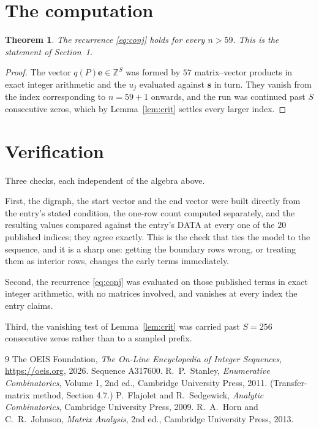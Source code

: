 \documentclass[11pt,a4paper]{article}
\theoremstyle{plain}
\newtheorem{theorem}{Theorem}
\theoremstyle{definition}
\begin{document}
\section{The computation}

\begin{theorem}
The recurrence \eqref{eq:conj} holds for every $n>59$. This is the statement of
Section~1.
\end{theorem}

\begin{proof}
The vector $q(P)\mathbf{e}\in\mathbb{Z}^{S}$ was formed by $57$ matrix--vector
products in exact integer arithmetic and the $u_j$ evaluated against $\mathbf{s}$ in turn.
They vanish from the index corresponding to $n=59+1$ onwards, and the run was continued
past $S$ consecutive zeros, which by Lemma~\ref{lem:crit} settles every larger index.
\end{proof}

\section{Verification}

Three checks, each independent of the algebra above.

First, the digraph, the start vector and the end vector were built directly from the
entry's stated condition, the one-row count computed separately, and the resulting values
compared against the entry's DATA at every one of the $20$ published indices; they
agree exactly. This is the check that ties the model to the sequence, and it is a sharp one:
getting the boundary rows wrong, or treating them as interior rows, changes the early terms
immediately.

Second, the recurrence \eqref{eq:conj} was evaluated on those published terms in exact
integer arithmetic, with no matrices involved, and vanishes at every index the entry claims.

Third, the vanishing test of Lemma~\ref{lem:crit} was carried past $S=256$ consecutive
zeros rather than to a sampled prefix.

\begin{thebibliography}{9}
 The OEIS Foundation, \emph{The On-Line Encyclopedia of Integer
Sequences}, \url{https://oeis.org}, 2026. Sequence A317600.
 R.~P.~Stanley, \emph{Enumerative Combinatorics}, Volume 1, 2nd ed.,
Cambridge University Press, 2011. (Transfer-matrix method, Section 4.7.)
 P.~Flajolet and R.~Sedgewick, \emph{Analytic Combinatorics}, Cambridge
University Press, 2009.
 R.~A.~Horn and C.~R.~Johnson, \emph{Matrix Analysis}, 2nd ed., Cambridge
University Press, 2013.
\end{thebibliography}
\end{document}
